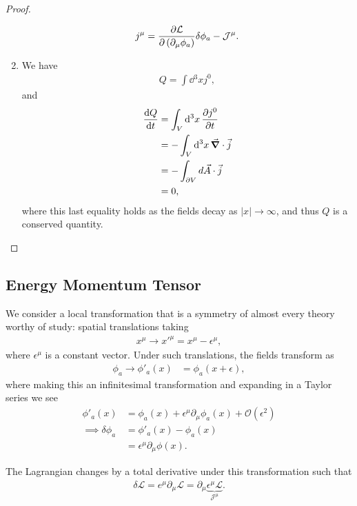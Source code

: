 \begin{proof}
\begin{enumerate}[label=\arabic*)]
\begin{align}
                j^{\mu} = \pdv{\mathcal{L}}{\left( \partial_\mu \phi_a \right) } \delta \phi_a - \mathcal{J}^{\mu}
            .\end{align}
        \item We have
            \begin{align}
                Q = \int \dd{^3x} j^{0}
            ,\end{align}
            and
            \begin{align}
                \dv{Q}{t} &= \int_V \dd{^3x} \pdv{j^{0}}{t} \\
                &= - \int_V \dd{^3x} \vec{\grad} \cdot \vec{j} \\
                &= - \int_{\partial V} d\vec{A} \cdot \vec{j} \\
                &= 0
            ,\end{align}
            where this last equality holds as the fields decay as $\left| x \right| \to \infty$, and thus $Q$ is a conserved quantity.
    \end{enumerate}
\end{proof}

\subsection{Energy Momentum Tensor}

We consider a local transformation that is a symmetry of almost every theory worthy of study: spatial translations taking
\begin{align}
    x^{\mu} \to x'^{\mu} = x^{\mu} - \epsilon^{\mu}
,\end{align}
where $\epsilon^{\mu}$ is a constant vector. Under such translations, the fields transform as
\begin{align}
    \phi_a \to \phi'_a \left( x \right) &= \phi_a \left( x + \epsilon \right) 
,\end{align}
where making this an infinitesimal transformation and expanding in a Taylor series we see
\begin{align}
    \phi'_a \left( x \right) &= \phi_a \left( x \right) + \epsilon^{\mu} \partial_\mu \phi_a \left( x \right) + \mathcal{O}\left( \epsilon^2 \right)  \\
    \implies \delta \phi_a &= \phi'_a \left( x \right) - \phi_a \left( x \right) \\
    &= \epsilon^{\mu} \partial_\mu \phi \left( x \right) 
.\end{align}

The Lagrangian changes by a total derivative under this transformation such that
\begin{align}
    \delta \mathcal{L} = e^{\mu} \partial_\mu \mathcal{L} = \partial_\mu \underbrace{\epsilon^{\mu} \mathcal{L}}_{\mathcal{J}^{\mu}}
.\end{align}

